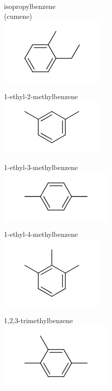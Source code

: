 \documentclass[10pt]{article}
\begin{document}
isopropylbenzene\\
(cumene)\\
\includegraphics{smile-e096ea111161a8893d9c9855a994851895f5bbcf}

1-ethyl-2-methylbenzene\\
\includegraphics{smile-c5f2d81920610ebe8f4097c1fef363271a58a233}

1-ethyl-3-methylbenzene\\
\includegraphics{smile-6f9512096ca8d843dad2548505da770fb34c92dd}

1-ethyl-4-methylbenzene\\
\includegraphics{smile-fad46b4c4a705bdf1a061a23bc4c82050d65ebd2}

1,2,3-trimethylbenzene\\
\includegraphics{smile-00e215c6c0e2d7504886fa7526f60de3fe529471}
\end{document}
